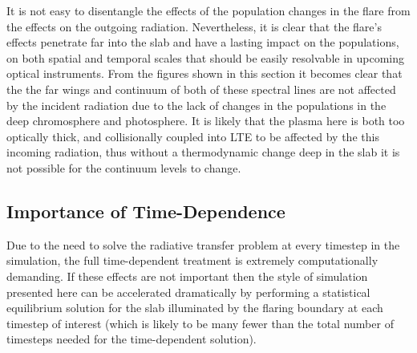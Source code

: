 
It is not easy to disentangle the effects of the population changes in the flare from the effects on the outgoing radiation.
Nevertheless, it is clear that the flare's effects penetrate far into the slab and have a lasting impact on the populations, on both spatial and temporal scales that should be easily resolvable in upcoming optical instruments.
From the figures shown in this section it becomes clear that the the far wings and continuum of both of these spectral lines are not affected by the incident radiation due to the lack of changes in the populations in the deep chromosphere and photosphere.
It is likely that the plasma here is both too optically thick, and collisionally coupled into LTE to be affected by the this incoming radiation, thus without a thermodynamic change deep in the slab it is not possible for the continuum levels to change.

\subsection{Importance of Time-Dependence}

Due to the need to solve the radiative transfer problem at every timestep in the \Radyn{} simulation, the full time-dependent treatment is extremely computationally demanding.
If these effects are not important then the style of simulation presented here can be accelerated dramatically by performing a statistical equilibrium solution for the slab illuminated by the flaring boundary at each timestep of interest (which is likely to be many fewer than the total number of timesteps needed for the time-dependent solution).

